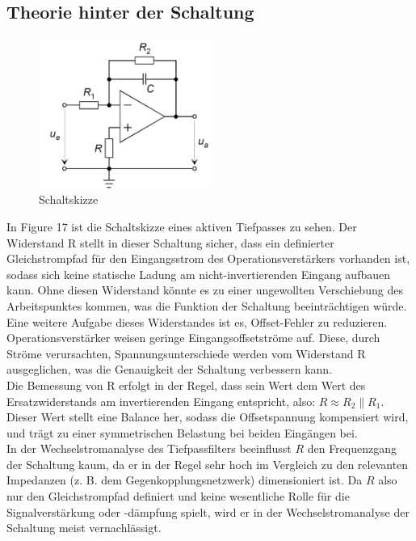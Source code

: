 \documentclass[a4paper,12pt]{article}
\begin{document}
\subsection{Theorie hinter der Schaltung}
\begin{figure}[H]
    \centering
    \includegraphics[width=0.5\textwidth]{../Quellen/Labor2/Versuch 6/Schaltungsplan.png}
\caption{Schaltskizze}
\end{figure}
In Figure 17 ist die Schaltskizze eines aktiven Tiefpasses zu sehen. Der Widerstand R stellt in dieser Schaltung sicher, dass ein definierter Gleichstrompfad für den Eingangsstrom des Operationsverstärkers vorhanden ist, sodass sich keine statische Ladung am nicht-invertierenden Eingang aufbauen kann. Ohne diesen Widerstand könnte es zu einer ungewollten Verschiebung des Arbeitspunktes kommen, was die Funktion der Schaltung beeinträchtigen würde. Eine weitere Aufgabe dieses Widerstandes ist es, Offset-Fehler zu reduzieren. Operationsverstärker weisen geringe Eingangsoffsetströme auf. Diese, durch Ströme verursachten, Spannungsunterschiede werden vom Widerstand R ausgeglichen, was die Genauigkeit der Schaltung verbessern kann.\\
Die Bemessung von R erfolgt in der Regel, dass sein Wert dem Wert des Ersatzwiderstands am invertierenden Eingang entspricht, also: \(
R \approx R_2 \parallel R_1\).\\
Dieser Wert stellt eine Balance her, sodass die Offsetspannung kompensiert wird, und trägt zu einer symmetrischen Belastung bei beiden Eingängen bei.\\
In der Wechselstromanalyse des Tiefpassfilters beeinflusst $R$ den Frequenzgang der Schaltung kaum, da er in der Regel sehr hoch im Vergleich zu den relevanten Impedanzen (z. B. dem Gegenkopplungsnetzwerk) dimensioniert ist. Da $R$ also nur den Gleichstrompfad definiert und keine wesentliche Rolle für die Signalverstärkung oder -dämpfung spielt, wird er in der Wechselstromanalyse der Schaltung meist vernachlässigt.
\end{document}
